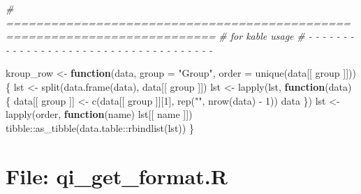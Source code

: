 \documentclass[
]{article}
\newenvironment{Shaded}{\begin{snugshade}}{\end{snugshade}}
\newcommand{\AttributeTok}[1]{\textcolor[rgb]{0.77,0.63,0.00}{#1}}
\newcommand{\CommentTok}[1]{\textcolor[rgb]{0.56,0.35,0.01}{\textit{#1}}}
\newcommand{\ControlFlowTok}[1]{\textcolor[rgb]{0.13,0.29,0.53}{\textbf{#1}}}
\newcommand{\DecValTok}[1]{\textcolor[rgb]{0.00,0.00,0.81}{#1}}
\newcommand{\FunctionTok}[1]{\textcolor[rgb]{0.00,0.00,0.00}{#1}}
\newcommand{\NormalTok}[1]{#1}
\newcommand{\OtherTok}[1]{\textcolor[rgb]{0.56,0.35,0.01}{#1}}
\newcommand{\SpecialCharTok}[1]{\textcolor[rgb]{0.00,0.00,0.00}{#1}}
\newcommand{\StringTok}[1]{\textcolor[rgb]{0.31,0.60,0.02}{#1}}
\begin{document}
\begin{Shaded}
\begin{Highlighting}[]
\CommentTok{\# ==========================================================================}
\CommentTok{\# for kable usage}
\CommentTok{\# {-} {-} {-} {-} {-} {-} {-} {-} {-} {-} {-} {-} {-} {-} {-} {-} {-} {-} {-} {-} {-} {-} {-} {-} {-} {-} {-} {-} {-} {-} {-} {-} {-} {-} {-} {-} {-}}

\NormalTok{kroup\_row }\OtherTok{\textless{}{-}} \ControlFlowTok{function}\NormalTok{(data, }\AttributeTok{group =} \StringTok{"Group"}\NormalTok{, }\AttributeTok{order =} \FunctionTok{unique}\NormalTok{(data[[ group ]]))}
\NormalTok{\{}
\NormalTok{  lst }\OtherTok{\textless{}{-}} \FunctionTok{split}\NormalTok{(}\FunctionTok{data.frame}\NormalTok{(data), data[[ group ]])}
\NormalTok{  lst }\OtherTok{\textless{}{-}} \FunctionTok{lapply}\NormalTok{(lst,}
    \ControlFlowTok{function}\NormalTok{(data) \{}
\NormalTok{      data[[ group ]] }\OtherTok{\textless{}{-}} \FunctionTok{c}\NormalTok{(data[[ group ]][}\DecValTok{1}\NormalTok{], }\FunctionTok{rep}\NormalTok{(}\StringTok{""}\NormalTok{, }\FunctionTok{nrow}\NormalTok{(data) }\SpecialCharTok{{-}} \DecValTok{1}\NormalTok{))}
\NormalTok{      data}
\NormalTok{    \})}
\NormalTok{  lst }\OtherTok{\textless{}{-}} \FunctionTok{lapply}\NormalTok{(order, }\ControlFlowTok{function}\NormalTok{(name) lst[[ name ]])}
\NormalTok{  tibble}\SpecialCharTok{::}\FunctionTok{as\_tibble}\NormalTok{(data.table}\SpecialCharTok{::}\FunctionTok{rbindlist}\NormalTok{(lst))}
\NormalTok{\}}
\end{Highlighting}
\end{Shaded}

\hypertarget{file-qi_get_format.r}{%
\section{File: qi\_get\_format.R}\label{file-qi_get_format.r}}
\end{document}
